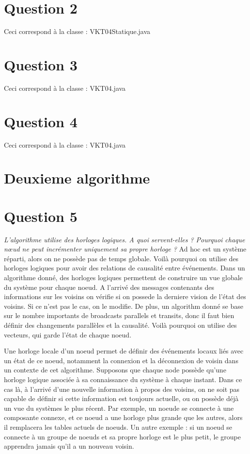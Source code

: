 \documentclass[11pt,a4paper,sans]{report}
\begin{document}
	\section{Question 2}
	Ceci correspond à la classe : VKT04Statique.java

	\section{Question 3}
	Ceci correspond à la classe : VKT04.java

	\section{Question 4}
	Ceci correspond à la classe : VKT04.java

	\section*{Deuxieme algorithme}

	\section{Question 5}
	\textit{L’algorithme utilise des horloges logiques. A quoi servent-elles ?  Pourquoi chaque nœud ne peut incrémenter uniquement sa propre horloge ?}
	Ad hoc est un système réparti, alors on ne possède pas de temps globale. Voilà pourquoi on utilise des horloges logiques pour avoir des relations de causalité entre événements. Dans un algorithme donné, des horloges logiques permettent de construire un vue globale du système pour chaque noeud. A l’arrivé des messages contenants des informations sur les voisins on vérifie si on possede la derniere vision de l’état des voisins. Si ce n’est pas le cas, on le modifie. De plus, un algorithm donné se base sur le nombre importants de broadcasts parallels et transits, donc il faut bien définir des changements parallèles et la causalité. Voilà pourquoi on utilise des vecteurs, qui garde l’état de chaque noeud.

	Une horloge locale d’un noeud permet de définir des événements locaux liés avec un état de ce noeud, notamment la connexion et la déconnexion de voisin dans un contexte de cet algorithme. Supposons que chaque node possède qu’une horloge logique associée à sa connaissance du système à chaque instant. Dans ce cas là, à l’arrivé d’une nouvelle information à propos des voisins, on ne soit pas capable de définir si cette information est toujours actuelle, ou on possède déjà un vue du systèmes le plus récent. Par exemple, un noeude se connecte à une composante connexe, et ce noeud a une horloge plus grande que les autres, alors il remplacera les tables actuels de noeuds. Un autre exemple :  si un noeud se connecte à un groupe de noeuds et sa propre horloge est le plus petit, le groupe apprendra jamais qu’il a un nouveau voisin.
\end{document}

